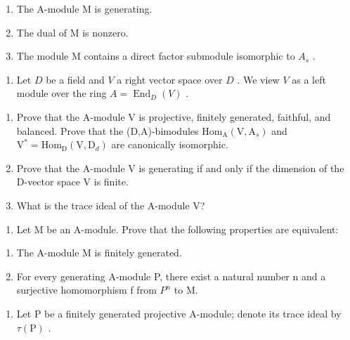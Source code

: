 \begin{enumerate}
\def\labelenumi{(\roman{enumi})}
\item
  The A-module M is generating.
\item
  The dual of M is nonzero.
\item
  The module M contains a direct factor submodule isomorphic to \(A_{s}\) .
\end{enumerate}

\begin{enumerate}
\def\labelenumi{\arabic{enumi})}
\setcounter{enumi}{8}
\tightlist
\item
  Let \(D\) be a field and \(V\) a right vector space over \(D\) . We view \(V\) as a left module over the ring \(A = \operatorname{End}_D(V)\) .
\end{enumerate}

\begin{enumerate}
\def\labelenumi{\alph{enumi})}
\item
  Prove that the A-module V is projective, finitely generated, faithful, and balanced. Prove that the (D,A)-bimodules \(\mathrm{Hom}_{\mathrm{A}}(\mathrm{V},\mathrm{A}_{s})\) and \(\mathrm{V}^{*}=\mathrm{Hom}_{\mathrm{D}}(\mathrm{V},\mathrm{D}_{d})\) are canonically isomorphic.
\item
  Prove that the A-module V is generating if and only if the dimension of the D-vector space V is finite.
\item
  What is the trace ideal of the A-module V?
\end{enumerate}

\begin{enumerate}
\def\labelenumi{\arabic{enumi})}
\setcounter{enumi}{9}
\tightlist
\item
  Let M be an A-module. Prove that the following properties are equivalent:
\end{enumerate}

\begin{enumerate}
\def\labelenumi{(\roman{enumi})}
\item
  The A-module M is finitely generated.
\item
  For every generating A-module P, there exist a natural number n and a surjective homomorphism f from \(P^{n}\) to M.
\end{enumerate}

\begin{enumerate}
\def\labelenumi{\arabic{enumi})}
\setcounter{enumi}{10}
\tightlist
\item
  Let \(\mathrm{P}\) be a finitely generated projective A-module; denote its trace ideal by \(\tau(\mathrm{P})\) .\\
\end{enumerate}

